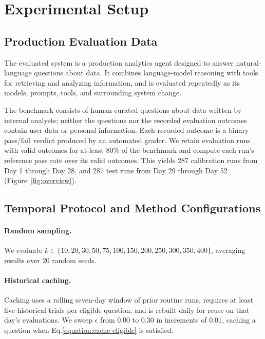 \section{Experimental Setup}
\label{sec:experimental-setup}

\subsection{Production Evaluation Data}

The evaluated system is a production analytics agent designed to answer
natural-language questions about data. It combines language-model reasoning
with tools for retrieving and analyzing information, and is evaluated
repeatedly as its models, prompts, tools, and surrounding system change.

The benchmark consists of human-curated questions about data written by internal analysts; neither the questions nor the recorded evaluation outcomes contain user data or personal information. Each recorded outcome is a binary pass/fail verdict produced by an automated grader. We
retain evaluation runs with valid outcomes for at least 80\% of the benchmark
and compute each run's reference pass rate over its valid outcomes. 
This yields 287 calibration runs from Day 1 through Day 28, and 287 test runs from Day 29 through Day 52 (Figure~\ref{fig:overview}).


\subsection{Temporal Protocol and Method Configurations}

\paragraph{Random sampling.}
We evaluate $k\in\{10,\allowbreak20,\allowbreak30,\allowbreak50,\allowbreak75,\allowbreak100,\allowbreak150,\allowbreak200,\allowbreak250,\allowbreak300,\allowbreak350,\allowbreak400\}$, averaging
results over 20 random seeds.

\paragraph{Historical caching.}
Caching uses a rolling seven-day window of prior routine runs, requires at least
five historical trials per eligible question, and is rebuilt daily for reuse on
that day’s evaluations. We sweep $\epsilon$ from 0.00 to 0.30 in increments of
0.01, caching a question when
Eq.\ref{equation:cache-eligible} is satisfied.

